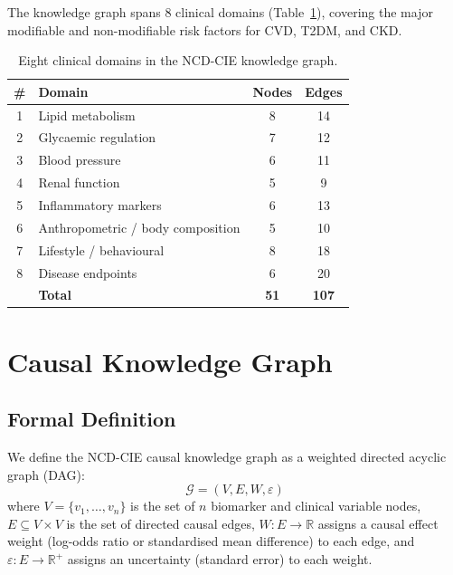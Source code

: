 \documentclass[runningheads]{llncs}
\begin{document}
The knowledge graph spans 8 clinical domains (Table~\ref{tab:domains}),
covering the major modifiable and non-modifiable risk factors for CVD,
T2DM, and CKD.

\begin{table}[t]
\centering
\caption{Eight clinical domains in the NCD-CIE knowledge graph.}
\label{tab:domains}
\small
\begin{tabular}{@{}clcc@{}}
\toprule
\textbf{\#} & \textbf{Domain} & \textbf{Nodes} & \textbf{Edges} \\
\midrule
1 & Lipid metabolism        & 8  & 14 \\
2 & Glycaemic regulation    & 7  & 12 \\
3 & Blood pressure          & 6  & 11 \\
4 & Renal function          & 5  & 9  \\
5 & Inflammatory markers    & 6  & 13 \\
6 & Anthropometric / body composition & 5 & 10 \\
7 & Lifestyle / behavioural & 8  & 18 \\
8 & Disease endpoints       & 6  & 20 \\
\midrule
  & \textbf{Total}          & \textbf{51} & \textbf{107} \\
\bottomrule
\end{tabular}
\end{table}

\section{Causal Knowledge Graph}\label{sec:kg}

\subsection{Formal Definition}\label{sec:formal}

We define the NCD-CIE causal knowledge graph as a weighted directed
acyclic graph (DAG):
\begin{equation}\label{eq:graph}
\mathcal{G} = (V, E, W, \varepsilon)
\end{equation}
where $V=\{v_1,\ldots,v_n\}$ is the set of $n$ biomarker and clinical
variable nodes, $E \subseteq V \times V$ is the set of directed causal
edges, $W: E \rightarrow \mathbb{R}$ assigns a causal effect weight
(log-odds ratio or standardised mean difference) to each edge, and
$\varepsilon: E \rightarrow \mathbb{R}^+$ assigns an uncertainty
(standard error) to each weight.
\end{document}
